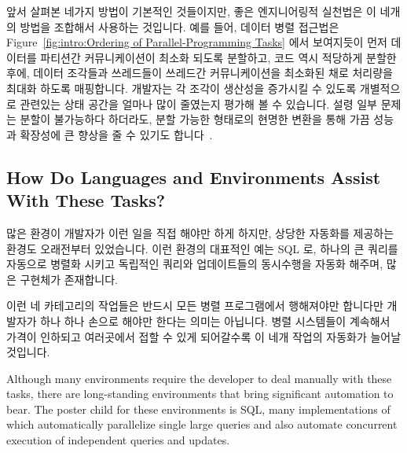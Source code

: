 앞서 살펴본 네가지 방법이 기본적인 것들이지만, 좋은 엔지니어링적 실천법은 이
네개의 방법을 조합해서 사용하는 것입니다.
예를 들어, 데이터 병렬 접근법은 Figure~\ref{fig:intro:Ordering of
Parallel-Programming Tasks} 에서 보여지듯이 먼저 데이터를 파티션간
커뮤니케이션이 최소화 되도록 분할하고, 코드 역시 적당하게 분할한 후에, 데이터
조각들과 쓰레드들이 쓰레드간 커뮤니케이션을 최소화된 채로 처리량을 최대화
하도록 매핑합니다.
개발자는 각 조각이 생산성을 증가시킬 수 있도록 개별적으로 관련있는 상태 공간을
얼마나 많이 줄였는지 평가해 볼 수 있습니다.
설령 일부 문제는 분할이 불가능하다 하더라도, 분할 가능한 형태로의 현명한 변환을
통해 가끔 성능과 확장성에 큰 향상을 줄 수 있기도
합니다~\cite{PanagiotisMetaxas1999PDCS}.

\subsection{How Do Languages and Environments Assist With These Tasks?}
\label{sec:intro:How Do Languages and Environments Assist With These Tasks?}

많은 환경이 개발자가 이런 일을 직접 해야만 하게 하지만, 상당한 자동화를
제공하는 환경도 오래전부터 있었습니다.
이런 환경의 대표적인 예는 SQL 로, 하나의 큰 쿼리를 자동으로 병렬화 시키고
독립적인 쿼리와 업데이트들의 동시수행을 자동화 해주며, 많은 구현체가
존재합니다.

이런 네 카테고리의 작업들은 반드시 모든 병렬 프로그램에서 행해져야만 합니다만
개발자가 하나 하나 손으로 해야만 한다는 의미는 아닙니다.
병렬 시스템들이 계속해서 가격이 인하되고 여러곳에서 접할 수 있게 되어갈수록 이
네개 작업의 자동화가 늘어날 것입니다.

\iffalse
Although many environments require the developer to deal manually
with these tasks, there are long-standing environments that bring
significant automation to bear.
The poster child for these environments is SQL, many implementations
of which automatically parallelize single large queries and also
automate concurrent execution of independent queries and updates.

